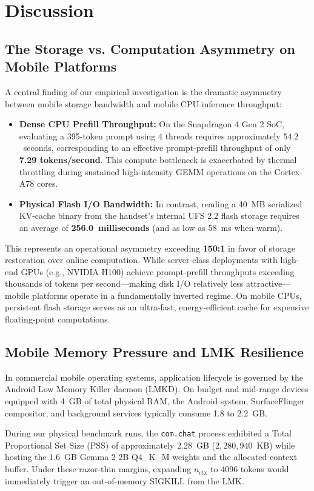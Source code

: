 \section{Discussion}
\label{sec:discussion}

\subsection{The Storage vs. Computation Asymmetry on Mobile Platforms}
A central finding of our empirical investigation is the dramatic asymmetry between mobile storage bandwidth and mobile CPU inference throughput:
\begin{itemize}
    \item \textbf{Dense CPU Prefill Throughput:} On the Snapdragon 4 Gen 2 SoC, evaluating a 395-token prompt using 4 threads requires approximately $54.2$~seconds, corresponding to an effective prompt-prefill throughput of only \textbf{7.29 tokens/second}. This compute bottleneck is exacerbated by thermal throttling during sustained high-intensity GEMM operations on the Cortex-A78 cores.
    \item \textbf{Physical Flash I/O Bandwidth:} In contrast, reading a 40~MB serialized KV-cache binary from the handset's internal UFS 2.2 flash storage requires an average of \textbf{256.0~milliseconds} (and as low as 58~ms when warm).
\end{itemize}

This represents an operational asymmetry exceeding \textbf{150:1} in favor of storage restoration over online computation. While server-class deployments with high-end GPUs (e.g., NVIDIA H100) achieve prompt-prefill throughputs exceeding thousands of tokens per second—making disk I/O relatively less attractive—mobile platforms operate in a fundamentally inverted regime. On mobile CPUs, persistent flash storage serves as an ultra-fast, energy-efficient cache for expensive floating-point computations.

\subsection{Mobile Memory Pressure and LMK Resilience}
In commercial mobile operating systems, application lifecycle is governed by the Android Low Memory Killer daemon (LMKD). On budget and mid-range devices equipped with 4~GB of total physical RAM, the Android system, SurfaceFlinger compositor, and background services typically consume 1.8 to 2.2~GB.

During our physical benchmark runs, the \texttt{com.chat} process exhibited a Total Proportional Set Size (PSS) of approximately $2.28$~GB ($2,280,940$~KB) while hosting the 1.6~GB Gemma 2 2B Q4\_K\_M weights and the allocated context buffer. Under these razor-thin margins, expanding $n_{\text{ctx}}$ to 4096 tokens would immediately trigger an out-of-memory SIGKILL from the LMK. 

